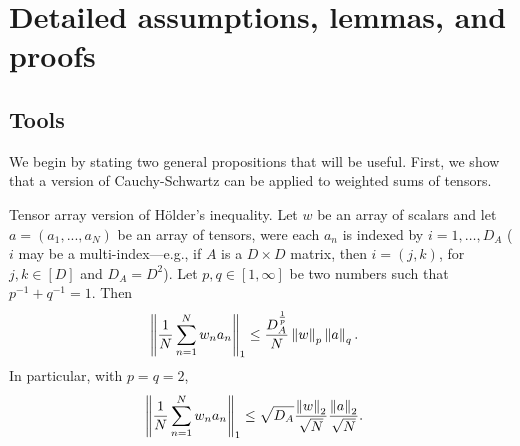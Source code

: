 \newcommand{\globalassum}{Assumptions \ref{assu:paper_smoothness}---\ref{assu:paper_bounded} }

\section{Detailed assumptions, lemmas, and proofs\label{sec:appendix_proofs}}





\subsection{Tools}

We begin by stating two general propositions that will be useful.
First, we show that a version of Cauchy-Schwartz can be applied to
weighted sums of tensors.
\begin{prop}
\label{propref:tensor_cauchy_schwartz}Tensor array version of H{\"o}lder's
inequality. Let $w$ be an array of scalars and let $a=\left(a_{1},...,a_{N}\right)$
be an array of tensors, were each $a_{n}$ is indexed by $i=1,\ldots,D_{A}$
($i$ may be a multi-index---e.g., if $A$ is a $D\times D$ matrix,
then $i=\left(j,k\right)$, for $j,k\in\left[D\right]$ and $D_{A}=D^{2}$).
Let $p,q\in\left[1,\infty\right]$ be two numbers such that $p^{-1}+q^{-1}=1$.
Then
\begin{align*}
\left\Vert \frac{1}{N}\sum_{n=1}^{N}w_{n}a_{n}\right\Vert_{1} & \le\frac{D_{A}^{\frac{1}{p}}}{N}\left\Vert w\right\Vert_{p}\left\Vert a\right\Vert_{q}.
\end{align*}
In particular, with $p=q=2$,
\begin{align*}
\left\Vert \frac{1}{N}\sum_{n=1}^{N}w_{n}a_{n}\right\Vert_{1} & \le\sqrt{D_{A}}\frac{\left\Vert w\right\Vert_{2}}{\sqrt{N}}\frac{\left\Vert a\right\Vert_{2}}{\sqrt{N}}.
\end{align*}
\end{prop}
